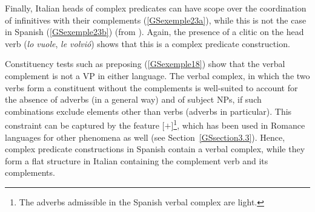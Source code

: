 \documentclass[output=paper
                ,modfonts
                ,nonflat
	        ,collection
	        ,collectionchapter
	        ,collectiontoclongg
 	        ,biblatex
                ,babelshorthands
                ,newtxmath
                ,draftmode
                ,colorlinks, citecolor=brown
]{./langsci/langscibook}
\begin{document}
{	\label{GSexemple22b}		
	
	\label{GSexemple22c}	
\zl

Finally, Italian heads of complex predicates can have scope over the coordination of infinitives with their complements (\ref{GSexemple23a}), while this is not the case in Spanish (\ref{GSexemple23b}) (from \citealt{AG2010}). Again, the presence of a clitic on the head verb (\emph{lo vuole}, \emph{le volvi\'o}) shows that this is a complex predicate construction.

\eal
\judgewidth{\%}
	\label{GSexemple23} 
	\label{GSexemple23a}

	\label{GSexemple23b}	
\zl

Constituency tests such as preposing (\ref{GSexemple18}) show that the verbal complement is not a VP in either language. The verbal complex, in which the two verbs form a constituent without the complements is well-suited to account for the absence of adverbs (in a general way) and of subject NPs, if such combinations exclude elements other than verbs (adverbs in particular). This constraint can be captured by the feature [\light $+$]\footnote{The adverbs admissible in the Spanish verbal complex are light.}, which has been used in Romance languages for other phenomena as well \citep{abeille2000french} (see Section~\ref{GSsection3.3}). Hence, complex predicate constructions in Spanish contain a verbal complex, while they form a flat structure in Italian containing the complement verb and its complements. 

}
\end{document}
